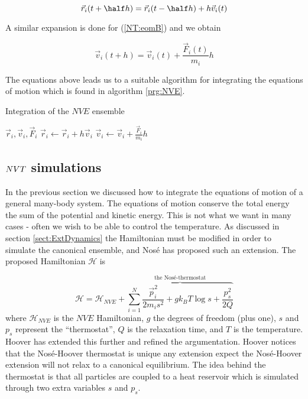 \[
  \vec{r}_i(t+\half h) = \vec{r}_i(t-\half h) + h\vec{v}_i(t)
\]

A similar expansion is done for (\ref{NT:eomB}) and we obtain

\[
  \vec{v}_i(t+h) = \vec{v}_i(t) + \frac{\vec{F}_i(t)}{m_i} h
\]

The equations above leads us to a suitable algorithm for integrating
the equations of motion which is found in algorithm \ref{prg:NVE}.

\begin{algorithm}
  \caption[Integration of the $NVE$ ensemble]{Integration of the $NVE$ ensemble}
  \label{prg:NVE}
  \begin{algorithmic}
    \REQUIRE $\vec{r}_i, \vec{v}_i, \vec{F}_i$
      \STATE $\vec{r}_i \leftarrow \vec{r}_i + h\vec{v}_i$
      \STATE $\vec{v}_i \leftarrow \vec{v}_i + \frac{\vec{F}_i}{m_i} h$
    \ENDFOR
  \end{algorithmic}
\end{algorithm}


\subsection{\protect$NVT\protect$ simulations}
\label{sect:NVTsimul}
In the previous section we discussed how to integrate the equations
of motion of a general many-body system. The equations of motion
conserve the total energy \ie the sum of the potential and kinetic
energy. This is not what we want in many cases - often we wish to be
able to control the temperature. As discussed in section
\ref{sect:ExtDynamics} the Hamiltonian must be modified in order to
simulate the canonical ensemble, and Nos\'{e} \cite{Nose84} has
proposed such an extension. The proposed Hamiltonian $\mathcal{H}$ is 

\begin{equation}
  \mathcal{H} = \mathcal{H}_{NVE} 
  + \overbrace{\sum_{i=1}^N \frac{\vec{p}_i^2}{2m_is^2} + g k_B T \log
  s + \frac{p_s^2}{2Q}}^{\mbox{the Nos\'{e}-thermostat}}
\end{equation}
where $\mathcal{H}_{NVE}$ is the $NVE$ Hamiltonian, $g$ the degrees of
freedom (plus one), $s$ and $p_s$ represent the ``thermostat'', $Q$ is
the relaxation time, and $T$ is the temperature. Hoover \cite{Hoover85}
has extended this further and refined the argumentation. Hoover
notices that the Nos\'{e}-Hoover thermostat is unique \ie any
extension expect the Nos\'{e}-Hoover extension will not relax to a
canonical equilibrium. The idea behind the thermostat is that all
particles are coupled to a heat reservoir 
which is simulated through two extra variables $s$ and $p_s$.

